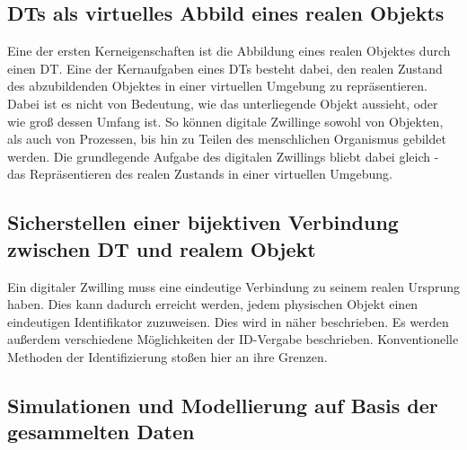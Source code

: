 \subsection{\ac{DT}s als virtuelles Abbild eines realen Objekts}

Eine der ersten Kerneigenschaften ist die Abbildung eines realen Objektes durch einen \ac{DT}. Eine der Kernaufgaben eines \ac{DT}s besteht dabei, den realen Zustand des abzubildenden Objektes in einer virtuellen Umgebung zu repräsentieren. Dabei ist es nicht von Bedeutung, wie das unterliegende Objekt aussieht, oder wie groß dessen Umfang ist. So können digitale Zwillinge sowohl von Objekten, als auch von Prozessen, bis hin zu Teilen des menschlichen Organismus gebildet werden. Die grundlegende Aufgabe des digitalen Zwillings bliebt dabei gleich - das Repräsentieren des realen Zustands in einer virtuellen Umgebung.

\subsection{Sicherstellen einer bijektiven Verbindung zwischen \ac{DT} und realem Objekt}

Ein digitaler Zwilling muss eine eindeutige Verbindung zu seinem realen Ursprung haben. Dies kann dadurch erreicht werden, jedem physischen Objekt einen eindeutigen Identifikator zuzuweisen. Dies wird in  näher beschrieben. Es werden außerdem verschiedene Möglichkeiten der ID-Vergabe beschrieben. Konventionelle Methoden der Identifizierung stoßen hier an ihre Grenzen. \autocites{barricelli2019survey}{rios2015product}

\subsection{Simulationen und Modellierung auf Basis der gesammelten Daten}

